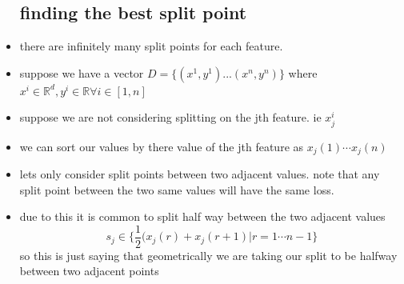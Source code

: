 \documentclass{article}
\begin{document}
\begin{itemize}
\subsection*{ finding the best split point}
\item there are infinitely many split points for each feature. 
\item suppose we have a vector $D=\{(x^1,y^1)...(x^n,y^n)\}$ where $x^i\in \mathbb{R}^{d}, y^i\in \mathbb{R}\forall i \in [1,n]$
\item suppose we are not considering splitting on the jth feature. ie $x^{i}_j$ 
\item we can sort our values by there value of the jth feature as $x_{j}(1)\cdots x_j(n)$
\item lets only consider split points between two adjacent values. note that any split point between the two same values will have the same loss.
\item due to this it is common to split half way between the two adjacent values $$s_j\in \{\frac{1}{2}(x_j(r)+x_{j}(r+1)|r=1\cdots n-1\}$$
so this is just saying that geometrically we are taking our split to be halfway between two adjacent points 

\end{itemize}
\end{document}
